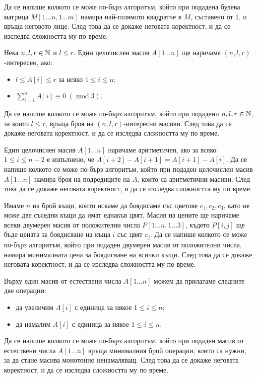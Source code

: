 \begin{problem}
Да се напише колкото се може по-бърз алгоритъм, който при подадена булева матрица $M[1 \dots n, 1 \dots m]$ намира най-голямото квадратче в $M$, съставено от $1$, и връща неговото лице.
След това да се докаже неговата коректност, и да се изследва сложността му по време.
\end{problem}

\begin{problem}
Нека $n, l, r \in \mathbb{N}$ и $l \leq r$.
Един целочислен масив $A[1 \dots n]$ ще наричаме $(n, l, r)$-интересен, ако:
\begin{itemize}
    \item $l \leq A[i] \leq r$ за всяко $1 \leq i \leq n$;
    \item $\sum\limits_{i = 1}^n A[i] \equiv 0 \; (\operatorname{mod} 3)$.
\end{itemize}
Да се напише колкото се може по-бърз алгоритъм, който при подадени $n, l, r \in \mathbb{N}$, за които $l \leq r$, връща броя на $(n, l, r)$-интересни масиви.
След това да се докаже неговата коректност, и да се изследва сложността му по време.
\end{problem}

\begin{problem}
Един целочислен масив $A[1 \dots n]$ наричаме аритметичен, ако за всяко $1 \leq i \leq n - 2$ е изпълнено, че $A[i + 2] - A[i + 1] = A[i + 1] - A[i]$.
Да се напише колкото се може по-бърз алгоритъм, който при подаден целочислен масив $A[1 \dots n]$ намира броя на подредиците на $A$, които са аритметични масиви.
След това да се докаже неговата коректност, и да се изследва сложността му по време.
\end{problem}

\begin{problem}
Имаме $n$ на брой къщи, които искаме да боядисаме със цветове $c_1, c_2, c_3$, като не може две съседни къщи да имат еднакъв цвят.
Масив на цените ще наричаме всеки двумерен масив от положителни числа $P[1 \dots n, 1 \dots 3]$, където $P[i, j]$ ще бъде цената за боядисване на къща $i$ със цвят $c_j$.
Да се напише колкото се може по-бърз алгоритъм, който при подаден двумерен масив от положителни числа, намира минималната цена за боядисване на всички къщи.
След това да се докаже неговата коректност, и да се изследва сложността му по време.
\end{problem}

\begin{problem}
Върху един масив от естествени числа $A[1 \dots n]$ можем да прилагаме следните две операции:
\begin{itemize}
    \item да увеличим $A[i]$ с единица за някое $1 \leq i \leq n$;
    \item да намалим $A[i]$ с единица за някое $1 \leq i \leq n$.
\end{itemize}
Да се напише колкото се може по-бърз алгоритъм, който при подаден масив от естествени числа $A[1 \dots n]$ връща минималния брой операции, които са нужни, за да стане масива монотонно ненамаляващ.
След това да се докаже неговата коректност, и да се изследва сложността му по време.
\end{problem}